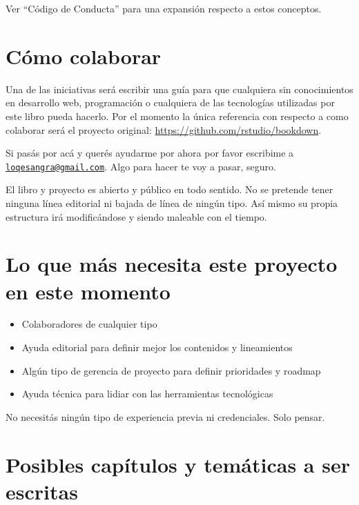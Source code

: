 \documentclass[
]{book}
\providecommand{\tightlist}{%
  \setlength{\itemsep}{0pt}\setlength{\parskip}{0pt}}
\begin{document}
Ver ``Código de Conducta'' para una expansión respecto a estos conceptos.

\hypertarget{cuxf3mo-colaborar}{%
\section{Cómo colaborar}\label{cuxf3mo-colaborar}}

Una de las iniciativas será escribir una guía para que cualquiera sin conocimientos en desarrollo web, programación o cualquiera de las tecnologías utilizadas por este libro pueda hacerlo. Por el momento la única referencia con respecto a como colaborar será el proyecto original: \url{https://github.com/rstudio/bookdown}.

Si pasás por acá y querés ayudarme por ahora por favor escribime a \href{mailto:loqesangra@gmail.com}{\nolinkurl{loqesangra@gmail.com}}. Algo para hacer te voy a pasar, seguro.

El libro y proyecto es abierto y público en todo sentido. No se pretende tener ninguna línea editorial ni bajada de línea de ningún tipo. Así mismo su propia estructura irá modificándose y siendo maleable con el tiempo.

\hypertarget{lo-que-muxe1s-necesita-este-proyecto-en-este-momento}{%
\section{Lo que más necesita este proyecto en este momento}\label{lo-que-muxe1s-necesita-este-proyecto-en-este-momento}}

\begin{itemize}
\tightlist
\item
  Colaboradores de cualquier tipo
\item
  Ayuda editorial para definir mejor los contenidos y lineamientos
\item
  Algún tipo de gerencia de proyecto para definir prioridades y roadmap
\item
  Ayuda técnica para lidiar con las herramientas tecnológicas
\end{itemize}

No necesitás ningún tipo de experiencia previa ni credenciales. Solo pensar.

\hypertarget{posibles-capuxedtulos-y-temuxe1ticas-a-ser-escritas}{%
\section{Posibles capítulos y temáticas a ser escritas}\label{posibles-capuxedtulos-y-temuxe1ticas-a-ser-escritas}}
\end{document}
